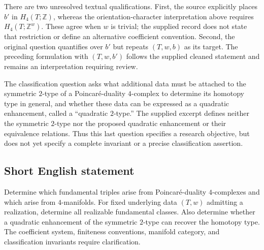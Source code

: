\documentclass[11pt]{article}
\begin{document}
There are two unresolved textual qualifications. First, the source explicitly places $b'$ in $H_4(T;\mathbb Z)$, whereas the orientation-character interpretation above requires $H_4(T;\mathbb Z^w)$. These agree when $w$ is trivial; the supplied record does not state that restriction or define an alternative coefficient convention. Second, the original question quantifies over $b'$ but repeats $(T,w,b)$ as its target. The preceding formulation with $(T,w,b')$ follows the supplied cleaned statement and remains an interpretation requiring review.

The classification question asks what additional data must be attached to the symmetric $2$-type of a Poincar\'e-duality $4$-complex to determine its homotopy type in general, and whether these data can be expressed as a quadratic enhancement, called a ``quadratic $2$-type.'' The supplied excerpt defines neither the symmetric $2$-type nor the proposed quadratic enhancement or their equivalence relations. Thus this last question specifies a research objective, but does not yet specify a complete invariant or a precise classification assertion.
\subsection{Short English statement}
Determine which fundamental triples arise from Poincar\'e-duality $4$-complexes and which arise from $4$-manifolds. For fixed underlying data $(T,w)$ admitting a realization, determine all realizable fundamental classes. Also determine whether a quadratic enhancement of the symmetric $2$-type can recover the homotopy type. The coefficient system, finiteness conventions, manifold category, and classification invariants require clarification.
\end{document}
